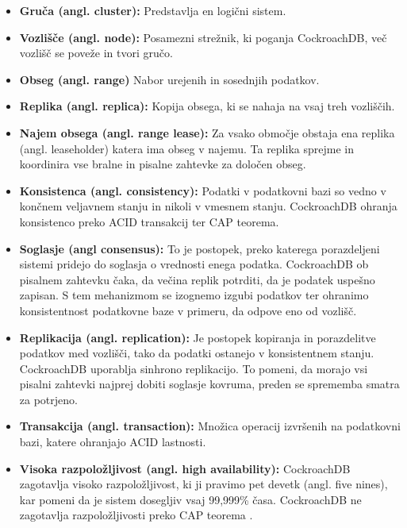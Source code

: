 \documentclass[a4paper, 12pt]{book}
\begin{document}
\begin{itemize}
    \item \textbf{Gruča (angl. cluster):} Predstavlja en logični sistem. 
    \item \textbf{Vozlišče (angl. node):} Posamezni strežnik, ki poganja CockroachDB, več vozlišč se poveže in tvori gručo.
    \item \textbf{Obseg (angl. range)} Nabor urejenih in sosednjih podatkov.
    \item \textbf{Replika (angl. replica):} Kopija obsega, ki se nahaja na vsaj treh vozliščih.
    \item \textbf{Najem obsega (angl. range lease):} Za vsako območje obstaja ena replika (angl. leaseholder) katera ima obseg v najemu. Ta replika sprejme in koordinira vse bralne in pisalne zahtevke za določen obseg.
    \item \textbf{Konsistenca (angl. consistency):} Podatki v podatkovni bazi so vedno v končnem veljavnem stanju in nikoli v vmesnem stanju. CockroachDB ohranja konsistenco preko ACID transakcij ter CAP teorema.
    \item \textbf{Soglasje (angl consensus):} To je postopek, preko katerega porazdeljeni sistemi pridejo do soglasja o vrednosti enega podatka. CockroachDB ob pisalnem zahtevku čaka, da večina replik potrditi, da je podatek uspešno zapisan. S tem mehanizmom se izognemo izgubi podatkov ter ohranimo konsistentnost podatkovne baze v primeru, da odpove eno od vozlišč.
    \item \textbf{Replikacija (angl. replication):} Je postopek kopiranja in porazdelitve podatkov med vozlišči, tako da podatki ostanejo v konsistentnem stanju. CockroachDB uporablja sinhrono replikacijo. To pomeni, da morajo vsi pisalni zahtevki najprej dobiti soglasje kovruma, preden se sprememba smatra za potrjeno.
    \item \textbf{Transakcija (angl. transaction):} Množica operacij izvršenih na podatkovni bazi, katere ohranjajo ACID lastnosti.
    \item \textbf{Visoka razpoložljivost (angl. high availability):} CockroachDB zagotavlja visoko razpoložljivost, ki ji pravimo pet devetk (angl. five nines), kar pomeni da je sistem dosegljiv vsaj 99,999\% časa. CockroachDB ne zagotavlja razpoložljivosti preko CAP teorema \cite{CRDB-FAQ}.
\end{itemize}
\end{document}

